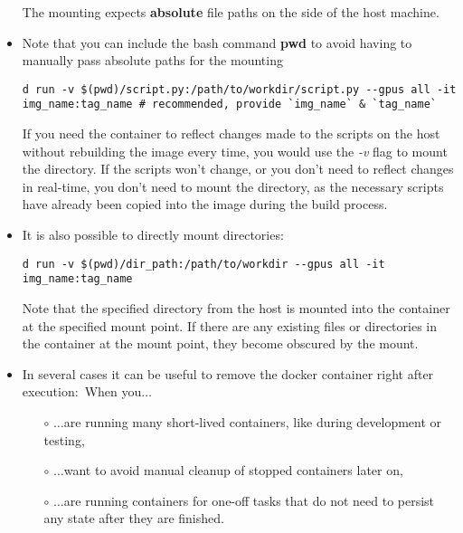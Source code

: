 \documentclass[12pt, a4paper]{scrbook}
\numberwithin{equation}{section}
\theoremstyle{definition}
\theoremstyle{definition}
\begin{document}
\begin{itemize}
		The mounting expects \textbf{absolute} file paths on the side of the host machine.
		
		\item Note that you can include the bash command \textbf{pwd} to avoid having to manually pass absolute paths for the mounting
		
		\begin{lstlisting}[style=mystylebash, label=alg:docker_run__with_pwd, xleftmargin=\parindent]
			d run -v $(pwd)/script.py:/path/to/workdir/script.py --gpus all -it img_name:tag_name # recommended, provide `img_name` & `tag_name`
		\end{lstlisting}
		
		If you need the container to reflect changes made to the scripts on the host without rebuilding the image every time, you would use the \textit{-v} flag to mount the directory. If the scripts won't change, or you don't need to reflect changes in real-time, you don't need to mount the directory, as the necessary scripts have already been copied into the image during the build process.
		
		\item It is also possible to directly mount directories:
		
		\begin{lstlisting}[style=mystylebash, label=alg:docker_run__mount_dir, xleftmargin=\parindent]
			d run -v $(pwd)/dir_path:/path/to/workdir --gpus all -it img_name:tag_name
		\end{lstlisting}
		
		Note that the specified directory from the host is mounted into the container at the specified mount point. If there are any existing files or directories in the container at the mount point, they become obscured by the mount.
		
		\item In several cases it can be useful to remove the docker container right after execution:~When you$\dots$
		\begin{itemize}
			\item[$\circ$] $\dots$are running many short-lived containers, like during development or testing,
			\item[$\circ$] $\dots$want to avoid manual cleanup of stopped containers later on,
			\item[$\circ$] $\dots$are running containers for one-off tasks that do not need to persist any state after they are finished.
		\end{itemize}
		

\end{itemize}
\end{document}
